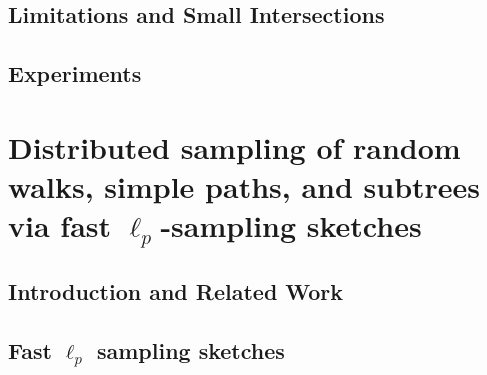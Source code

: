 \documentclass{report}
\begin{document}
\section{Limitations and Small Intersections}
 \label{DS:sec:intersections}


\section{Experiments}
 \label{DS:sec:experiments}




\chapter{Distributed sampling of random walks, simple paths, and subtrees via fast $\ell_p$-sampling sketches}
 \label{chap:walks}


\section{Introduction and Related Work}
 \label{walks:sec:intro}



\section{Fast $\ell_p$ sampling sketches}
 \label{walks:sec:sampling}


\end{document}
